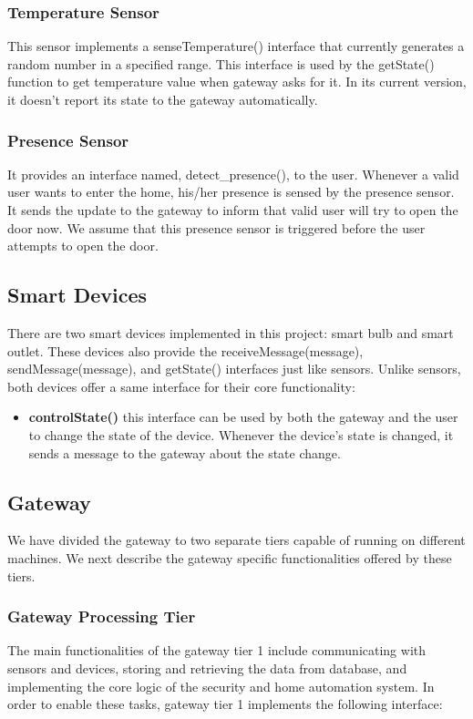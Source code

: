 \documentclass[12pt]{article}
\begin{document}
\subsubsection{Temperature Sensor}
This sensor implements a senseTemperature() interface that currently generates 
a random number in a specified range. This interface is used by the getState() 
function to get temperature value when gateway asks for it. In its current version, 
it doesn't report its state to the gateway automatically. 

\subsubsection{Presence Sensor}
It provides an interface named, detect\_presence(), to the user. Whenever a valid user 
wants to enter the home, his/her presence is sensed by the presence sensor. 
 It sends the update to the gateway to inform that valid user will try to open the 
 door now. We assume that this presence sensor is triggered before the 
 user attempts to open the door. 


\subsection{Smart Devices}

There are two smart devices implemented in this project: smart bulb and smart outlet. 
These devices also provide the receiveMessage(message), sendMessage(message), and 
getState() interfaces just like sensors. 
Unlike sensors, both devices offer a same interface for their core functionality:
 \begin{itemize}
 	\item \textbf{controlState()} this interface can be used by both the gateway and the user to 
 	change the state of the device. Whenever the device's state is changed,
 	it sends a message to the gateway about the state change. 
 \end{itemize} 

\subsection{Gateway}

We have divided the gateway to two separate tiers capable of running on different 
machines. We next describe the gateway specific functionalities offered by these tiers. 

\subsubsection{Gateway Processing Tier}
The main functionalities of the gateway tier 1 include communicating with sensors and 
devices, storing and retrieving the data from database, and implementing the core 
logic of the security and home automation system. In order to enable these tasks, 
gateway tier 1 implements the following interface: 
\end{document}
